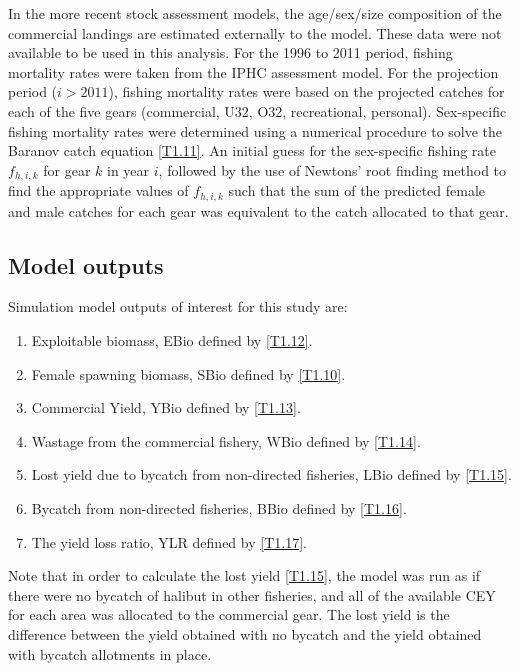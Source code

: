 
In the more recent stock assessment models, the age/sex/size composition of the commercial landings are estimated externally to the model.  These data were not available to be used in this analysis. For the 1996 to 2011 period, fishing mortality rates were taken from the IPHC assessment model.  For the projection period ($i>2011$), fishing mortality rates were based on the projected catches for each of the five gears (commercial, U32, O32, recreational, personal). Sex-specific fishing mortality rates were determined using a numerical procedure to solve the Baranov catch equation \eqref{T1.11}.  An initial guess for the sex-specific fishing rate $f_{h,i,k}$ for gear $k$ in year $i$, followed by the use of Newtons' root finding method to find the appropriate values of $f_{h,i,k}$ such that the sum of the predicted female and male catches for each gear was equivalent to the catch allocated to that gear.  
\subsection{Model outputs} %
\label{sub:model_outputs}
Simulation model outputs of interest for this study are:
\begin{enumerate}
	\item Exploitable biomass,  EBio defined by \eqref{T1.12}.
	\item Female spawning biomass, SBio defined by \eqref{T1.10}.
	\item Commercial Yield, YBio defined by \eqref{T1.13}.
	\item Wastage from the commercial fishery, WBio defined by \eqref{T1.14}.
	\item Lost yield due to bycatch from non-directed fisheries, LBio defined by \eqref{T1.15}.
	\item Bycatch from non-directed fisheries, BBio defined by \eqref{T1.16}.
	\item The yield loss ratio, YLR defined by \eqref{T1.17}.
\end{enumerate}

Note that in order to calculate the lost yield \eqref{T1.15}, the model was run as if there were no bycatch of halibut in other fisheries, and all of the available CEY for each area was allocated to the commercial gear.  The lost yield is the difference between the yield obtained with no bycatch and the yield obtained with bycatch allotments in place.





